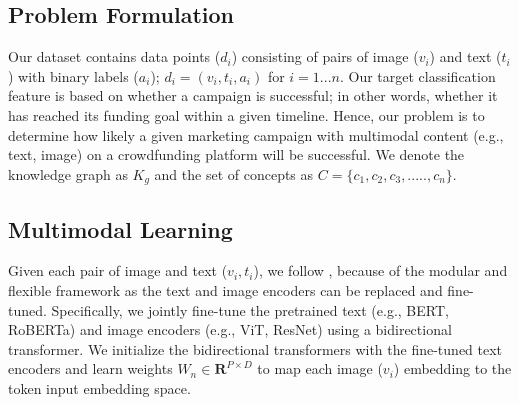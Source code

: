 \subsection{Problem Formulation}
Our dataset contains data points  ($d_i$) consisting of pairs of image ($v_i$) and text ($t_i$) with binary labels ($a_i$); $d_i = {(v_i,t_i,a_i)}$ for $i=1...n$.
Our target classification feature is %
based on whether a campaign is successful; in other words, whether it has reached its funding goal within a given timeline.
Hence, our problem is to determine how likely a given marketing campaign with multimodal content (e.g., text, image) on a crowdfunding platform will be successful.
We denote the knowledge graph as $K_g$ and the set of concepts as $C = {\{c_1, c_2, c_3, ....., c_n\}}$.


\subsection{Multimodal Learning}
\label{mmbt-kil-model}
Given each pair of image and text ($v_i,t_i$), we follow \cite{kiela2020supervised}, 
because of the modular and flexible framework as the text and image encoders can be replaced and fine-tuned. Specifically, we jointly fine-tune the pretrained text (e.g., BERT, RoBERTa) and image encoders (e.g., ViT, ResNet) 
using a bidirectional transformer. We initialize the bidirectional transformers with the fine-tuned text encoders and learn weights $W_n \in \mathbf{R}^{P\times D}$ to map each image ($v_i$) embedding to the token input embedding space. 


